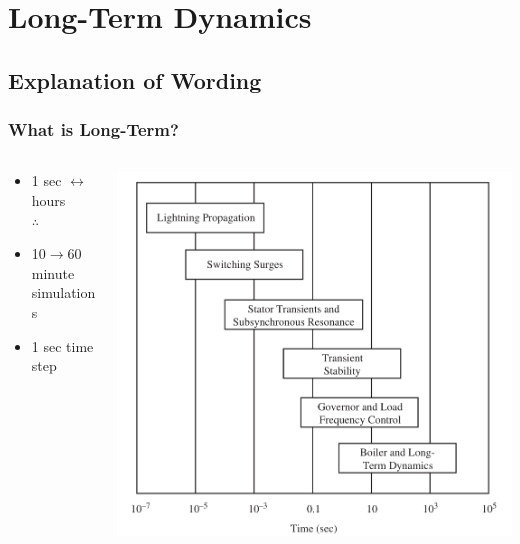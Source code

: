 \documentclass[14pt, unknownkeysallowed]{beamer}
\begin{document}
\section{Long-Term Dynamics}
\subsection{Explanation of Wording}
\begin{frame}
\frametitle{What is Long-Term?}
\begin{columns}
\begin{column}{0.4\textwidth}
   \begin{itemize}
\small
\item 1 sec $\leftrightarrow$ hours \\
$\therefore$ 
\item 10$\rightarrow$60 minute simulations
\item 1 sec time step
\end{itemize}
\end{column}
\begin{column}{0.7\textwidth}
    \begin{center}
     \includegraphics[height=.8\textheight]{timeScales}{\footnotesize\cite{SauerPaiChow}} 
     \end{center}
\end{column}
\end{columns}
\end{frame}
\end{document}
